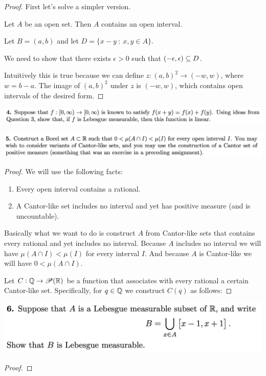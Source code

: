 \begin{proof}
  First let's solve a simpler version.

  Let $A$ be an open set. Then $A$ contains an open interval.

  Let $B = (a, b)$ and let $D = \big\{ x - y ~:~ x, y \in A\big\}$.

  We need to show that there exists $\epsilon > 0$ such that $(-\epsilon, \epsilon) \subseteq D$.

  Intuitively this is true because we can define $z:(a, b)^2 \to (-w, w)$, where $w = b - a$. The image
  of $(a, b)^2$ under $z$ is $(-w, w)$, which contains open intervals of the desired form.
\end{proof}




\newpage
\begin{mdframed}
\includegraphics[width=400pt]{img/analysis--berkeley-202a-hw05-eb07.png}
\end{mdframed}



\newpage
\begin{mdframed}
\includegraphics[width=400pt]{img/analysis--berkeley-202a-hw05-40cd.png}
\end{mdframed}

\begin{proof}
  We will use the following facts:
  \begin{enumerate}
  \item Every open interval contains a rational.
  \item A Cantor-like set includes no interval and yet has positive measure (and is uncountable).
  \end{enumerate}

  Basically what we want to do is construct $A$ from Cantor-like sets that contains every rational and yet
  includes no interval. Because $A$ includes no interval we will have $\mu(A \cap I) < \mu(I)$ for every
  interval $I$. And because $A$ is Cantor-like we will have $0 < \mu(A \cap I)$.

  Let $C: \mathbb{Q} \to \mathscr{P}(\mathbb{R})$ be a function that associates with every rational a certain Cantor-like set.
  Specifically, for $q \in \mathbb{Q}$ we construct $C(q)$ as follows:

\end{proof}

\newpage
\begin{mdframed}
\includegraphics[width=400pt]{img/analysis--berkeley-202a-hw05-3d2c.png}
\end{mdframed}

\begin{proof}

\end{proof}